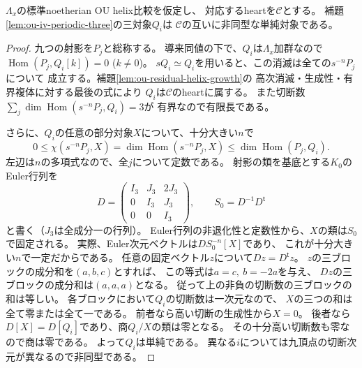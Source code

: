 \begin{lemma}
\label{lem:ou-iv-periodic-simple}
$\Lambda_x$の標準noetherian OU helix比較を仮定し、
対応するheartを$\mathcal C$とする。
補題\ref{lem:ou-iv-periodic-three}の三対象$Q_i$は
$\mathcal C$の互いに非同型な単純対象である。
\end{lemma}
\begin{proof}
九つの射影を$P_j$と総称する。
導来同値の下で、$Q_i$は$\Lambda_x$加群なので
$\operatorname{Hom}(P_j,Q_i[k])=0$ ($k\ne0$)。
$sQ_i\simeq Q_i$を用いると、この消滅は全ての$s^{-n}P_j$について
成立する。補題\ref{lem:ou-residual-helix-growth}の
高次消滅・生成性・有界複体に対する最後の式により
$Q_i$は$\mathcal C$のheartに属する。
また切断数$\sum_j\dim\operatorname{Hom}(s^{-n}P_j,Q_i)=3$が
有界なので有限長である。

さらに、$Q_i$の任意の部分対象$X$について、十分大きい$n$で
\[
 0\leq \chi(s^{-n}P_j,X)
 =\dim\operatorname{Hom}(s^{-n}P_j,X)
 \leq \dim\operatorname{Hom}(P_j,Q_i).
\]
左辺は$n$の多項式なので、全$j$について定数である。
射影の類を基底とする$K_0$のEuler行列を
\[
 D=\begin{pmatrix}I_3&J_3&2J_3\\0&I_3&J_3\\0&0&I_3\end{pmatrix},
 \qquad S_0=D^{-1}D^{\mathsf t}
\]
と書く（$J_3$は全成分一の行列）。
Euler行列の非退化性と定数性から、$X$の類は$S_0$で固定される。
実際、Euler次元ベクトルは$D S_0^{-n}[X]$であり、
これが十分大きい$n$で一定だからである。
任意の固定ベクトル$z$について$D z=D^{\mathsf t}z$。
$z$の三ブロックの成分和を$(a,b,c)$とすれば、
この等式は$a=c,\ b=-2a$を与え、
$D z$の三ブロックの成分和は$(a,a,a)$となる。
従って上の非負の切断数の三ブロックの和は等しい。
各ブロックにおいて$Q_i$の切断数は一次元なので、
$X$の三つの和は全て零または全て一である。
前者なら高い切断の生成性から$X=0$。
後者なら$D[X]=D[Q_i]$であり、商$Q_i/X$の類は零となる。
その十分高い切断数も零なので商は零である。
よって$Q_i$は単純である。
異なる$i$については九頂点の切断次元が異なるので非同型である。
\end{proof}

